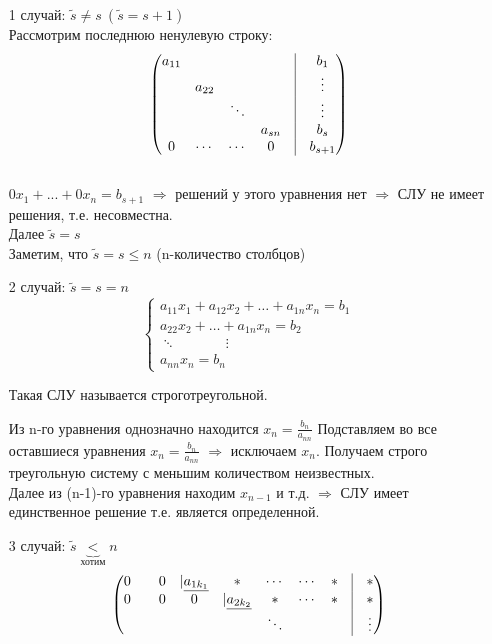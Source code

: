 \documentclass[a4paper, 12pt]{article}
\theoremstyle{definition}
\begin{document}
  \begin{itemize}
    \item[1 случай:]
    $\widetilde{s} \neq s \ (\widetilde{s}=s+1)$ \\ 
    Рассмотрим последнюю ненулевую строку:
    $$\begin{pmatrix}
      a_{11} & \null & \null & \null & \vline & b_1 \\
      \null & a_{22} & \null & \null & \vline & \vdots \\
      \null & \null & \ddots & \null & \vline & \vdots \\
      \null & \null & \null & a_{sn} & \vline & b_s \\
      0 & \cdots & \cdots & 0 & \vline & b_{s+1}
    \end{pmatrix}$$ \\
    $0x_1+...+0x_n=b_{s+1}$ 
    $\Longrightarrow$ решений у этого уравнения нет 
    $\Longrightarrow$ СЛУ не имеет решения, т.е. несовместна. \\
    Далее $\widetilde{s}=s$\\
    Заметим, что $\widetilde{s}=s\leq n$ (n-количество столбцов)
    \item[2 случай:] $\widetilde{s}=s=n$  
    $$\left\{ \begin{aligned}
      a_{11} x_1 + a_{12} x_2+ \dots + a_{1n} x_n = b_1 \\
      a_{22} x_2 + \dots + a_{1n} x_n = b_2 \\ 
      \ddots \ \ \ \ \ \ \ \ \ \ \ \ \ \ \ \ \vdots \ \\
      a_{nn} x_n = b_n
    \end{aligned}
    \right.$$

    Такая СЛУ называется строготреугольной.

    Из n-го уравнения однозначно находится $x_n = \frac{b_n}{a_{nn}}$
    Подставляем во все оставшиеся уравнения $x_n = \frac{b_n}{a_{nn}}$ $\Longrightarrow$ исключаем $x_n$. Получаем строго треугольную систему с меньшим количеством неизвестных.  \\
    Далее из (n-1)-го уравнения  находим $x_{n-1}$ и т.д. $\Longrightarrow$ СЛУ имеет единственное решение т.е. является определенной.

    \item[3 случай:] $\widetilde{s}\underbrace{<}_{\text{хотим}} n$ 
  $$\begin{pmatrix}
    0 & \null & 0 & |\underline{a_{1k_1}} & \ast & \cdots & \cdots & \ast & \vline & \ast  \\
    0 & \null & 0 & 0 & |\underline{a_{2k_2}} & \ast & \cdots & \ast & \vline & \ast \\
    \null & \null & \null & \null & \null & \ddots & \null & \null & \vline & \vdots
  \end{pmatrix}$$ 


\end{itemize}
\end{document}
